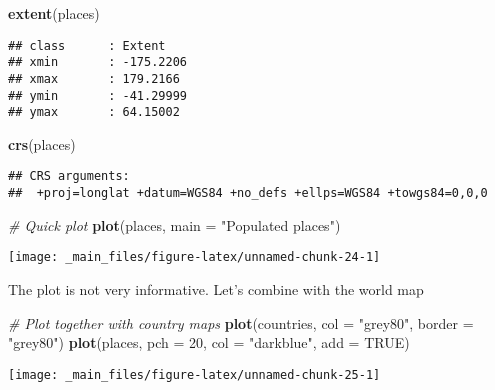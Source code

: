 \documentclass[]{book}
\newenvironment{Shaded}{\begin{snugshade}}{\end{snugshade}}
\newcommand{\CommentTok}[1]{\textcolor[rgb]{0.56,0.35,0.01}{\textit{#1}}}
\newcommand{\DataTypeTok}[1]{\textcolor[rgb]{0.13,0.29,0.53}{#1}}
\newcommand{\DecValTok}[1]{\textcolor[rgb]{0.00,0.00,0.81}{#1}}
\newcommand{\KeywordTok}[1]{\textcolor[rgb]{0.13,0.29,0.53}{\textbf{#1}}}
\newcommand{\NormalTok}[1]{#1}
\newcommand{\OtherTok}[1]{\textcolor[rgb]{0.56,0.35,0.01}{#1}}
\newcommand{\StringTok}[1]{\textcolor[rgb]{0.31,0.60,0.02}{#1}}
\begin{document}
\begin{Shaded}
\begin{Highlighting}[]
\KeywordTok{extent}\NormalTok{(places)}
\end{Highlighting}
\end{Shaded}

\begin{verbatim}
## class      : Extent 
## xmin       : -175.2206 
## xmax       : 179.2166 
## ymin       : -41.29999 
## ymax       : 64.15002
\end{verbatim}

\begin{Shaded}
\begin{Highlighting}[]
\KeywordTok{crs}\NormalTok{(places)}
\end{Highlighting}
\end{Shaded}

\begin{verbatim}
## CRS arguments:
##  +proj=longlat +datum=WGS84 +no_defs +ellps=WGS84 +towgs84=0,0,0
\end{verbatim}

\begin{Shaded}
\begin{Highlighting}[]
\CommentTok{# Quick plot}
\KeywordTok{plot}\NormalTok{(places, }\DataTypeTok{main =} \StringTok{"Populated places"}\NormalTok{)  }
\end{Highlighting}
\end{Shaded}

\begin{center}\texttt{[image: \_main\_files/figure-latex/unnamed-chunk-24-1]} \end{center}

The plot is not very informative. Let's combine with the world map

\begin{Shaded}
\begin{Highlighting}[]
\CommentTok{# Plot together with country maps}
\KeywordTok{plot}\NormalTok{(countries, }\DataTypeTok{col =} \StringTok{"grey80"}\NormalTok{, }\DataTypeTok{border =} \StringTok{"grey80"}\NormalTok{)}
\KeywordTok{plot}\NormalTok{(places, }\DataTypeTok{pch =} \DecValTok{20}\NormalTok{, }\DataTypeTok{col =} \StringTok{"darkblue"}\NormalTok{, }\DataTypeTok{add =} \OtherTok{TRUE}\NormalTok{)}
\end{Highlighting}
\end{Shaded}

\begin{center}\texttt{[image: \_main\_files/figure-latex/unnamed-chunk-25-1]} \end{center}
\end{document}
